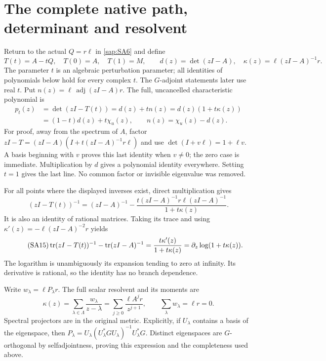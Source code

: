 \documentclass[11pt]{article}
\begin{document}
\section{The complete native path, determinant and resolvent}

Return to the actual $Q=r\ell$ in \eqref{sap:SA6} and define
\begin{equation}\tag{SA12}\label{sap:SA12}
T(t)=A-tQ,\quad T(0)=A,\quad T(1)=M,\qquad
d(z)=\det(zI-A),\quad
\kappa(z)=\ell(zI-A)^{-1}r.
\end{equation}
The parameter $t$ is an algebraic perturbation parameter;
all identities of polynomials below hold for every complex
$t$. The $G$-adjoint statements later use real $t$.
Put $n(z)=\ell\,\operatorname{adj}(zI-A)r$.
The full, uncancelled characteristic polynomial is
\begin{equation}\tag{SA13}\label{sap:SA13}
\begin{split}
p_t(z)&=\det(zI-T(t))=d(z)+t n(z)
       =d(z)(1+t\kappa(z))\\
      &=(1-t)d(z)+t\chi_u(z),\qquad
n(z)=\chi_u(z)-d(z).
\end{split}
\end{equation}
For proof, away from the spectrum of $A$, factor
$zI-T=(zI-A)(I+t(zI-A)^{-1}r\ell)$ and use
$\det(I+v\ell)=1+\ell v$. A basis beginning with $v$
proves this last identity when $v\ne0$; the zero case is
immediate. Multiplication by $d$ gives a polynomial
identity everywhere. Setting $t=1$ gives the last line.
No common factor or invisible eigenvalue was removed.

For all points where the displayed inverses exist, direct
multiplication gives
\begin{equation}\tag{SA14}\label{sap:SA14}
(zI-T(t))^{-1}
=(zI-A)^{-1}
-\frac{t(zI-A)^{-1}r\ell(zI-A)^{-1}}
       {1+t\kappa(z)}.
\end{equation}
It is also an identity of rational matrices.
Taking its trace and using
$\kappa'(z)=-\ell(zI-A)^{-2}r$ yields
\begin{equation}\tag{SA15}\label{sap:SA15}
\operatorname{tr}(zI-T(t))^{-1}-\operatorname{tr}(zI-A)^{-1}
=\frac{t\kappa'(z)}{1+t\kappa(z)}
=\partial_z\log(1+t\kappa(z)).
\end{equation}
The logarithm is unambiguously its expansion tending to
zero at infinity. Its derivative is rational, so the
identity has no branch dependence.

Write $w_\lambda=\ell P_\lambda r$. The full scalar
resolvent and its moments are
\begin{equation}\tag{SA16}\label{sap:SA16}
\kappa(z)=\sum_{\lambda\in\Lambda}
\frac{w_\lambda}{z-\lambda}
=\sum_{j\geq0}\frac{\ell A^jr}{z^{j+1}},
\qquad \sum_\lambda w_\lambda=\ell r=0.
\end{equation}
Spectral projectors are in the original metric. Explicitly,
if $U_\lambda$ contains a basis of the eigenspace, then
$P_\lambda=U_\lambda(U_\lambda^*GU_\lambda)^{-1}
U_\lambda^*G$. Distinct eigenspaces are $G$-orthogonal
by selfadjointness, proving this expression and the
completeness used above.
\end{document}

